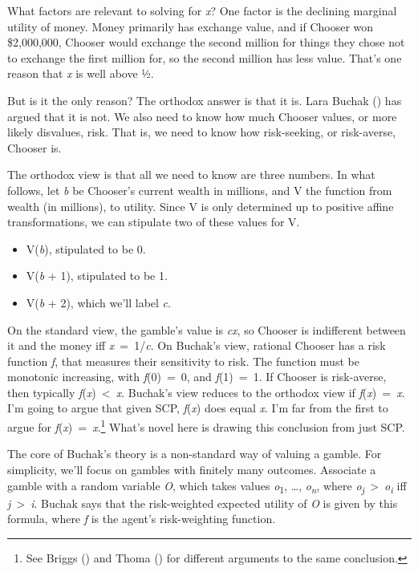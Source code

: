 \documentclass[
  10pt,
  letterpaper,
  DIV=11,
  numbers=noendperiod,
  twoside]{scrartcl}
\providecommand{\tightlist}{%
  \setlength{\itemsep}{0pt}\setlength{\parskip}{0pt}}\usepackage{longtable,booktabs,array}
\begin{document}
What factors are relevant to solving for \emph{x}? One factor is the
declining marginal utility of money. Money primarily has exchange value,
and if Chooser won \$2,000,000, Chooser would exchange the second
million for things they chose not to exchange the first million for, so
the second million has less value. That's one reason that \emph{x} is
well above ½.

But is it the only reason? The orthodox answer is that it is. Lara
Buchak () has argued that it is not. We
also need to know how much Chooser values, or more likely disvalues,
risk. That is, we need to know how risk-seeking, or risk-averse, Chooser
is.

The orthodox view is that all we need to know are three numbers. In what
follows, let \emph{b} be Chooser's current wealth in millions, and V the
function from wealth (in millions), to utility. Since V is only
determined up to positive affine transformations, we can stipulate two
of these values for V.

\begin{itemize}
\tightlist
\item
  V(\emph{b}), stipulated to be 0.
\item
  V(\emph{b} + 1), stipulated to be 1.
\item
  V(\emph{b} + 2), which we'll label \emph{c}.
\end{itemize}

On the standard view, the gamble's value is \emph{cx}, so Chooser is
indifferent between it and the money iff \emph{x}~=~1/\emph{c}. On
Buchak's view, rational Chooser has a risk function \emph{f}, that
measures their sensitivity to risk. The function must be monotonic
increasing, with \emph{f}(0)~=~0, and \emph{f}(1)~=~1. If Chooser is
risk-averse, then typically \emph{f}(\emph{x})~\textless~\emph{x}.
Buchak's view reduces to the orthodox view if
\emph{f}(\emph{x})~=~\emph{x}. I'm going to argue that given SCP,
\emph{f}(\emph{x}) does equal \emph{x}. I'm far from the first to argue
for \emph{f}(\emph{x})~=~\emph{x}.\footnote{See Briggs
  () and Thoma
  () for different arguments to the same
  conclusion.} What's novel here is drawing this conclusion from just
SCP.

The core of Buchak's theory is a non-standard way of valuing a gamble.
For simplicity, we'll focus on gambles with finitely many outcomes.
Associate a gamble with a random variable \emph{O}, which takes values
\emph{o}\textsubscript{1}, \ldots, \emph{o\textsubscript{n}}, where
\emph{o\textsubscript{j}}~\textgreater~\emph{o\textsubscript{i}} iff
\emph{j}~\textgreater~\emph{i}. Buchak says that the risk-weighted
expected utility of \emph{O} is given by this formula, where \emph{f} is
the agent's risk-weighting function.
\end{document}

